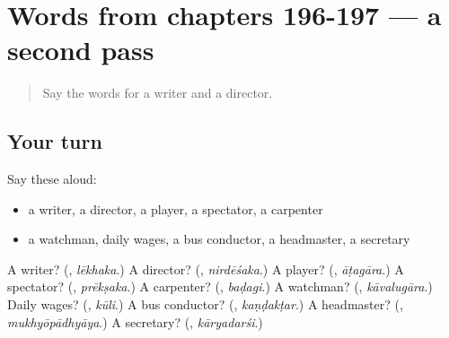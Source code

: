 \section[(dialogue)]{Words from chapters 196-197 — a second pass}

\label{lesson:KA-R197-second-pass-words-from-chapters-196-197}



\begin{quote}
Say the words for a writer and a director.
\end{quote}

\subsection*{Your turn}
Say these aloud:

\begin{itemize}
\raggedright
  \item a writer, a director, a player, a spectator, a carpenter
  \item a watchman, daily wages, a bus conductor, a headmaster, a secretary
\end{itemize}

\begin{tcolorbox}[breakable,colback=teal!4,colframe=teal!35!black,title={Before you move on}]
A writer? (\textbf{}, \emph{lēkhaka}.) A director? (\textbf{}, \emph{nirdēśaka}.) A player? (\textbf{}, \emph{āṭagāra}.) A spectator? (\textbf{}, \emph{prēkṣaka}.) A carpenter? (\textbf{}, \emph{baḍagi}.) A watchman? (\textbf{}, \emph{kāvalugāra}.) Daily wages? (\textbf{}, \emph{kūli}.) A bus conductor? (\textbf{}, \emph{kaṇḍakṭar}.) A headmaster? (\textbf{}, \emph{mukhyōpādhyāya}.) A secretary? (\textbf{}, \emph{kāryadarśi}.)
\end{tcolorbox}
